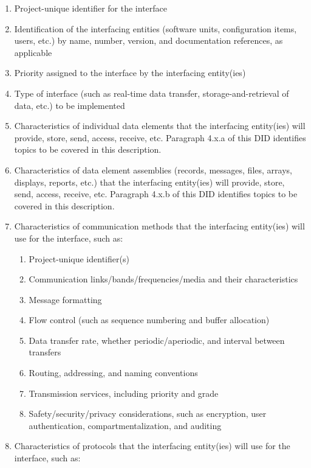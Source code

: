 \begin{enumerate}
  \begin{enumerate}
  \itemsep1pt\parskip0pt
  \item
    Project-unique identifier for the interface
  \item
    Identification of the interfacing entities (software units,
    configuration items, users, etc.) by name, number, version, and
    documentation references, as applicable
  \item
    Priority assigned to the interface by the interfacing entity(ies)
  \item
    Type of interface (such as real-time data transfer,
    storage-and-retrieval of data, etc.) to be implemented
  \item
    Characteristics of individual data elements that the interfacing
    entity(ies) will provide, store, send, access, receive, etc.
    Paragraph 4.x.a of this DID identifies topics to be covered in this
    description.
  \item
    Characteristics of data element assemblies (records, messages,
    files, arrays, displays, reports, etc.) that the interfacing
    entity(ies) will provide, store, send, access, receive, etc.
    Paragraph 4.x.b of this DID identifies topics to be covered in this
    description.
  \item
    Characteristics of communication methods that the interfacing
    entity(ies) will use for the interface, such as:

    \begin{enumerate}
    \itemsep1pt\parskip0pt
    \item
      Project-unique identifier(s)
    \item
      Communication links/bands/frequencies/media and their
      characteristics
    \item
      Message formatting
    \item
      Flow control (such as sequence numbering and buffer allocation)
    \item
      Data transfer rate, whether periodic/aperiodic, and interval
      between transfers
    \item
      Routing, addressing, and naming conventions
    \item
      Transmission services, including priority and grade
    \item
      Safety/security/privacy considerations, such as encryption, user
      authentication, compartmentalization, and auditing
    \end{enumerate}
  \item
    Characteristics of protocols that the interfacing entity(ies) will
    use for the interface, such as:


\end{enumerate}
\end{enumerate}
